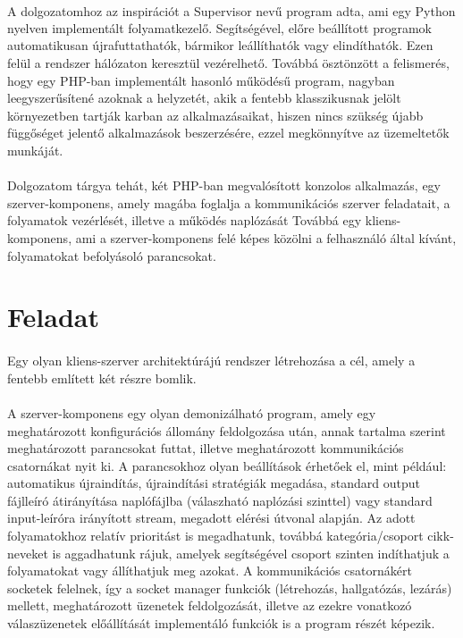 \documentclass[12pt]{report}
\begin{document}
\paragraph{}
A dolgozatomhoz az inspirációt a Supervisor\textsuperscript{\cite{supervisor}} nevű program adta, ami egy Python nyelven implementált folyamatkezelő. Segítségével, előre beállított programok automatikusan újrafuttathatók, bármikor leállíthatók vagy elindíthatók. Ezen felül a rendszer hálózaton keresztül vezérelhető.
Továbbá ösztönzött a felismerés, hogy egy PHP-ban implementált hasonló működésű program, nagyban leegyszerűsítené azoknak a helyzetét, akik a fentebb klasszikusnak jelölt környezetben tartják karban az alkalmazásaikat, hiszen nincs szükség újabb függőséget jelentő alkalmazások beszerzésére, ezzel megkönnyítve az üzemeltetők munkáját.

\paragraph{}
Dolgozatom tárgya tehát, két PHP-ban megvalósított konzolos alkalmazás, egy szerver-komponens, amely magába foglalja a kommunikációs szerver feladatait, a folyamatok vezérlését, illetve a működés naplózását Továbbá egy kliens-komponens, ami a szerver-komponens  felé képes közölni a felhasználó által kívánt, folyamatokat befolyásoló parancsokat.

\section{Feladat}\label{par:feladat}
\paragraph{}
Egy olyan kliens-szerver architektúrájú rendszer létrehozása a cél, amely a fentebb említett két részre bomlik. 
\paragraph{}
A szerver-komponens egy olyan demonizálható program, amely egy meghatározott konfigurációs állomány feldolgozása után, annak tartalma szerint meghatározott parancsokat futtat, illetve meghatározott kommunikációs csatornákat nyit ki. A parancsokhoz olyan beállítások érhetőek el, mint például: automatikus újraindítás, újraindítási stratégiák megadása, standard output fájlleíró átirányítása naplófájlba (válaszható naplózási szinttel) vagy standard input-leíróra irányított stream, megadott elérési útvonal alapján. Az adott folyamatokhoz relatív prioritást is megadhatunk, továbbá kategória/csoport cikk-neveket is aggadhatunk rájuk, amelyek segítségével csoport szinten indíthatjuk a folyamatokat vagy állíthatjuk meg azokat. A kommunikációs csatornákért socketek felelnek, így a socket manager funkciók (létrehozás, hallgatózás, lezárás) mellett, meghatározott üzenetek feldolgozását, illetve az ezekre vonatkozó válaszüzenetek előállítását implementáló funkciók is a program részét képezik.
\end{document}
